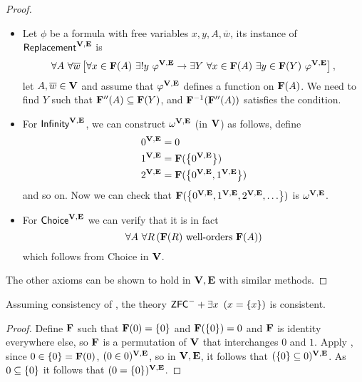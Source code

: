 \begin{proof}
\begin{itemize}
        \item Let \(\phi\) be a formula with free variables \(x,y,A,\overline{w}\), its instance of \(\textsf{Replacement}^{\mathbf{V},\mathbf{E}}\) is
            \[ \forall A~\forall \overline{w} \left[ 
                    \forall x\in\mathbf{F}(A) ~ \exists!y\ \varphi^{\mathbf{V},\mathbf{E}} \rightarrow \exists Y~ \forall x\in \mathbf{F}(A)~ \exists y\in \mathbf{F}(Y)~ \varphi^{\mathbf{V},\mathbf{E}}
                 \right],
            \]
            let \(A,\overline{w}\in \mathbf{V}\) and assume that \(\varphi^{\mathbf{V},\mathbf{E}}\) defines a function on \(\mathbf{F}(A)\).
            We need to find \(Y\) such that \(\mathbf{F}''(A) \subseteq \mathbf{F}(Y)\), and \(\mathbf{F}^{-1}(\mathbf{F}''(A))\) satisfies the condition.

        \item For \({\normalfont\textsf{Infinity}}^{\mathbf{V},\mathbf{E}}\), we can construct \(\omega^{\mathbf{V},\mathbf{E}}\) (in \(\mathbf{V}\)) as follows, define
            \begin{align*}
                0^{\mathbf{V},\mathbf{E}} &= 0 \\
                1^{\mathbf{V},\mathbf{E}} &= \mathbf{F}({\left\{ 0^{\mathbf{V},\mathbf{E}} \right\}}) \\
                2^{\mathbf{V},\mathbf{E}} &= \mathbf{F}({\left\{ 0^{\mathbf{V},\mathbf{E}}, 1^{\mathbf{V},\mathbf{E}} \right\}})
            \end{align*}
            and so on. Now we can check that \(\F(\set{0^{\V,\E},1^{\V,\E},2^{\V,\E},\dots})\) is \(\omega^{\mathbf{V},\mathbf{E}}\).

        \item For \(\textsf{Choice}^{\mathbf{V},\mathbf{E}}\) we can verify that it is in fact
            \[ \forall A~\forall R\left(\mathbf{F}(R) \text{ well-orders } \mathbf{F}(A)\right) \]
            which follows from \textsf{Choice} in \(\mathbf{V}\).
    \end{itemize}
    The other axioms can be shown to hold in \(\mathbf{V},\mathbf{E}\) with similar methods.
\end{proof}

\begin{example}\label{babyAtomExample}
    Assuming consistency of \ZFC, the theory \(\mbox{\normalfont \textsf{ZFC}}^- + \exists x~\left(x = {\left\{ x \right\}}\right)\) is consistent.
\end{example}
\begin{proof}
    Define \(\mathbf{F}\) such that \(\mathbf{F}(0) = {\left\{ 0 \right\}}\) and \(\mathbf{F}({\left\{ 0 \right\}}) = 0\) and \(\mathbf{F}\) is identity everywhere else,
    so \(\mathbf{F}\) is a permutation of \(\mathbf{V}\) that interchanges \(0\) and \(1\).
    Apply ,
    since \(0 \in {\left\{ 0 \right\}} = \mathbf{F}(0)\), \((0\in 0)^{\mathbf{V},\mathbf{E}}\),
    so in \(\mathbf{V},\mathbf{E}\), it follows that \(({\left\{ 0 \right\}} \subseteq 0)^{\mathbf{V},\mathbf{E}}\).
    As \(0 \subseteq {\left\{ 0 \right\}}\) it follows that \((0 = {\left\{ 0 \right\}})^{\mathbf{V},\mathbf{E}}\).
\end{proof}

